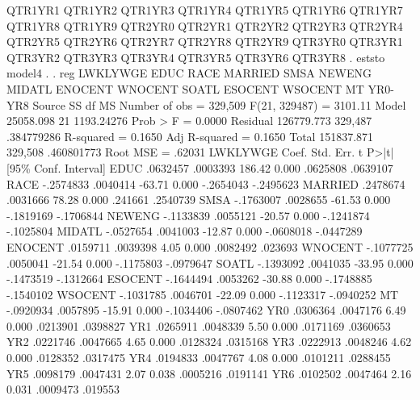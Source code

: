                QTR1YR1 QTR1YR2 QTR1YR3 QTR1YR4 QTR1YR5 QTR1YR6 QTR1YR7
               QTR1YR8 QTR1YR9 QTR2YR0 QTR2YR1 QTR2YR2 QTR2YR3 QTR2YR4
               QTR2YR5 QTR2YR6 QTR2YR7 QTR2YR8 QTR2YR9 QTR3YR0 QTR3YR1
               QTR3YR2 QTR3YR3 QTR3YR4 QTR3YR5 QTR3YR6 QTR3YR8
{\smallskip}
. eststo model4
{\smallskip}
. 
. reg  LWKLYWGE EDUC  RACE MARRIED SMSA NEWENG MIDATL ENOCENT WNOCENT SOATL ESOCENT WSOCENT MT YR0-YR8  
{\smallskip}
      Source {\VBAR}       SS           df       MS      Number of obs   =   329,509
   F(21, 329487)   =   3101.11
       Model {\VBAR}   25058.098        21  1193.24276   Prob > F        =    0.0000
    Residual {\VBAR}  126779.773   329,487  .384779286   R-squared       =    0.1650
   Adj R-squared   =    0.1650
       Total {\VBAR}  151837.871   329,508  .460801773   Root MSE        =    .62031
{\smallskip}
    LWKLYWGE {\VBAR}      Coef.   Std. Err.      t    P>|t|     [95\% Conf. Interval]
        EDUC {\VBAR}   .0632457   .0003393   186.42   0.000     .0625808    .0639107
        RACE {\VBAR}  -.2574833   .0040414   -63.71   0.000    -.2654043   -.2495623
     MARRIED {\VBAR}   .2478674   .0031666    78.28   0.000      .241661    .2540739
        SMSA {\VBAR}  -.1763007   .0028655   -61.53   0.000    -.1819169   -.1706844
      NEWENG {\VBAR}  -.1133839   .0055121   -20.57   0.000    -.1241874   -.1025804
      MIDATL {\VBAR}  -.0527654   .0041003   -12.87   0.000    -.0608018   -.0447289
     ENOCENT {\VBAR}   .0159711   .0039398     4.05   0.000     .0082492     .023693
     WNOCENT {\VBAR}  -.1077725   .0050041   -21.54   0.000    -.1175803   -.0979647
       SOATL {\VBAR}  -.1393092   .0041035   -33.95   0.000    -.1473519   -.1312664
     ESOCENT {\VBAR}  -.1644494   .0053262   -30.88   0.000    -.1748885   -.1540102
     WSOCENT {\VBAR}  -.1031785   .0046701   -22.09   0.000    -.1123317   -.0940252
          MT {\VBAR}  -.0920934   .0057895   -15.91   0.000    -.1034406   -.0807462
         YR0 {\VBAR}   .0306364   .0047176     6.49   0.000     .0213901    .0398827
         YR1 {\VBAR}   .0265911   .0048339     5.50   0.000     .0171169    .0360653
         YR2 {\VBAR}   .0221746   .0047665     4.65   0.000     .0128324    .0315168
         YR3 {\VBAR}   .0222913   .0048246     4.62   0.000     .0128352    .0317475
         YR4 {\VBAR}   .0194833   .0047767     4.08   0.000     .0101211    .0288455
         YR5 {\VBAR}   .0098179   .0047431     2.07   0.038     .0005216    .0191141
         YR6 {\VBAR}   .0102502   .0047464     2.16   0.031     .0009473     .019553
